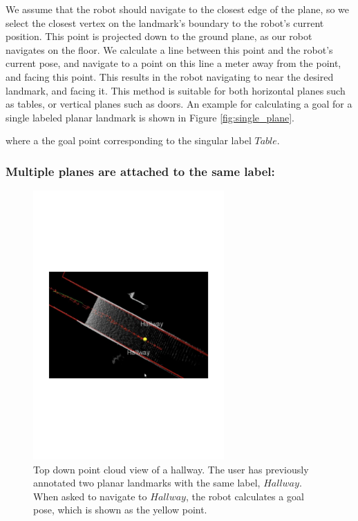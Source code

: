 We assume that the robot should navigate to the closest edge of the plane, so we select the closest vertex on the landmark's boundary to the robot's current position. This point is projected down to the ground plane, as our robot navigates on the floor. We calculate a line between this point and the robot's current pose, and navigate to a point on this line a meter away from the point, and facing this point. This results in the robot navigating to near the desired landmark, and facing it. This method is suitable for both horizontal planes such as tables, or vertical planes such as doors. An example for calculating a goal for a single labeled planar landmark is shown in Figure \ref{fig:single_plane}. 

where a the goal point corresponding to the singular label $Table$. 

\subsubsection{Multiple planes are attached to the same label: }

\begin{figure}[ht!]
\centering
\includegraphics[width=0.65\textwidth]{pics/double_plane}
\caption{Top down point cloud view of a hallway. The user has previously annotated two planar landmarks with the same label, $Hallway$. When asked to navigate to $Hallway$, the robot calculates a goal pose, which is shown as the yellow point.}
\label{fig:double_plane}
\end{figure}

